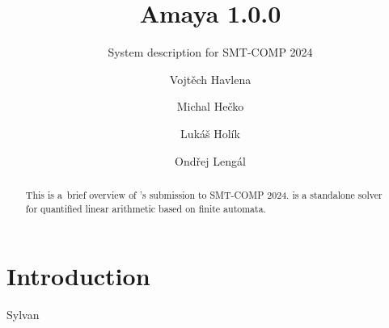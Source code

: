 \documentclass[acmsmall,screen,nonacm=true]{acmart}
\begin{document}
\title{Amaya 1.0.0}
\subtitle{System description for SMT-COMP 2024}

\author{Vojtěch Havlena}

\author{Michal Hečko}

\author{Lukáš Holík}

\author{Ondřej Lengál}



\begin{abstract}
  This is a~brief overview of \amaya's submission to SMT-COMP 2024.
  \amaya is a standalone solver for quantified linear arithmetic based on finite automata.
\end{abstract}

\maketitle


\section{Introduction}

\ol{}

Sylvan~\cite{DijkP15}



\end{document}
